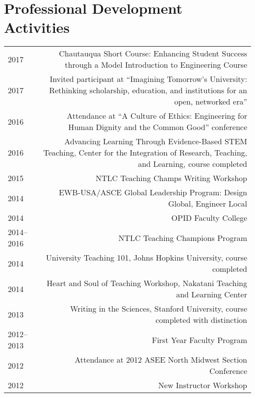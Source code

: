 \section*{Professional Development Activities}
\begin{tabular}{L!{\VRule}R}
2017&Chautauqua Short Course: Enhancing Student Success through a Model Introduction to Engineering Course\\
2017&Invited participant at ``Imagining Tomorrow's University: Rethinking scholarship, education, and institutions for an open, networked era''\\
2016&Attendance at ``A Culture of Ethics: Engineering for Human Dignity and the Common Good'' conference\\
2016&Advancing Learning Through Evidence-Based STEM Teaching, Center for the Integration of Research, Teaching, and Learning, course completed\\
2015&NTLC Teaching Champs Writing Workshop\\
2014&EWB-USA/ASCE Global Leadership Program: Design Global, Engineer Local\\
2014&OPID Faculty College\\
2014--2016&NTLC Teaching Champions Program\\
2014&University Teaching 101, Johns Hopkins University, course completed\\
2014&Heart and Soul of Teaching Workshop, Nakatani Teaching and Learning Center\\
2013&Writing in the Sciences, Stanford University, course completed with distinction\\
2012--2013&First Year Faculty Program\\
2012&Attendance at 2012 ASEE North Midwest Section Conference\\
2012&New Instructor Workshop\\
\end{tabular}